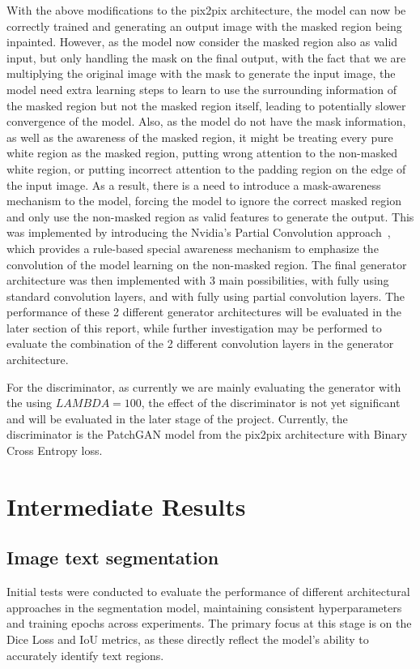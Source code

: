 \documentclass[10pt,twocolumn,letterpaper]{article}
\begin{document}
With the above modifications to the pix2pix architecture, the model can now be correctly trained and generating an output image with the masked region being inpainted. However, as the model now 
consider the masked region also as valid input, but only handling the mask on the final output, with the fact that we are multiplying the original image with the mask to generate the input image, 
the model need extra learning steps to learn to use the surrounding information of the masked region but not the masked region itself, leading to potentially slower convergence of the model. Also,
as the model do not have the mask information, as well as the awareness of the masked region, it might be treating every pure white region as the masked region, putting wrong attention to the 
non-masked white region, or putting incorrect attention to the padding region on the edge of the input image. As a result, there is a need to introduce a mask-awareness mechanism to the 
model, forcing the model to ignore the correct masked region and only use the non-masked region as valid features to generate the output. This was implemented by introducing the Nvidia's 
Partial Convolution approach~\cite{Liu2018}, which provides a rule-based special awareness mechanism to emphasize the convolution of the model learning on the non-masked region. The final 
generator architecture was then implemented with 3 main possibilities, with fully using standard convolution layers, and with fully using partial convolution layers. The performance of these 2 
different generator architectures will be evaluated in the later section of this report, while further investigation may be performed to evaluate the combination of the 2 different convolution 
layers in the generator architecture.

For the discriminator, as currently we are mainly evaluating the generator with the using $LAMBDA = 100$, the effect of the discriminator is not yet significant and will be evaluated in the later
stage of the project. Currently, the discriminator is the PatchGAN model from the pix2pix architecture with Binary Cross Entropy loss. 

\section{Intermediate Results}

\subsection{Image text segmentation}
Initial tests were conducted to evaluate the performance of different architectural approaches in the segmentation model, maintaining consistent 
hyperparameters and training epochs across experiments. The primary focus at this stage is on the Dice Loss and IoU metrics, as these 
directly reflect the model's ability to accurately identify text regions. 
\end{document}
